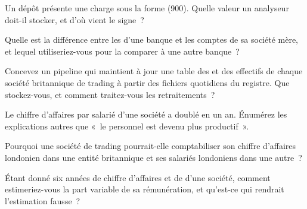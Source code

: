 \begin{interviewq}\label{iq:in:reading-a-trading-firms-accounts:1}
Un dépôt présente une charge sous la forme (900). Quelle valeur un analyseur doit-il stocker, et d'où vient le signe~?
\end{interviewq}

\begin{interviewq}\label{iq:in:reading-a-trading-firms-accounts:2}
Quelle est la différence entre les  d'une banque et les comptes de sa société mère, et lequel utiliseriez-vous
pour la comparer à une autre banque~?
\end{interviewq}

\begin{interviewq}\label{iq:in:reading-a-trading-firms-accounts:3}
Concevez un pipeline qui maintient à jour une table des  et des effectifs de chaque société britannique de trading à partir des
fichiers quotidiens du registre. Que stockez-vous, et comment traitez-vous les retraitements~?
\end{interviewq}

\begin{interviewq}\label{iq:in:reading-a-trading-firms-accounts:4}
Le chiffre d'affaires par salarié d'une société a doublé en un an. Énumérez les explications autres que «~le personnel est devenu plus
productif~». 
\end{interviewq}

\begin{interviewq}\label{iq:in:reading-a-trading-firms-accounts:5}
Pourquoi une société de trading pourrait-elle comptabiliser son chiffre d'affaires londonien dans une entité britannique et ses salariés londoniens dans une autre~?
\end{interviewq}

\begin{interviewq}\label{iq:in:reading-a-trading-firms-accounts:6}
Étant donné six années de chiffre d'affaires et de  d'une société, comment estimeriez-vous la part variable de sa rémunération, et
qu'est-ce qui rendrait l'estimation fausse~?
\end{interviewq}
